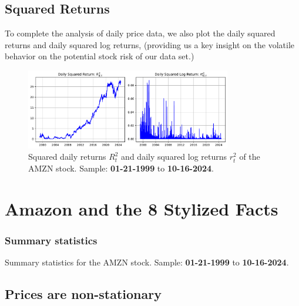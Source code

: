 \documentclass{article}
\begin{document}
\subsection{Squared Returns}

To complete the analysis of daily price data, we also plot the daily squared returns and daily squared log returns, 
(providing us a key insight on the volatile behavior on the potential stock risk of our data set.)
\begin{figure}[H]
    \centering
    \includegraphics[width=0.8\textwidth]{Img/squared_log_returns.pdf}
    \caption{Squared daily returns $R_t^2$ and daily squared log returns $r_t^2$ of the AMZN stock.
    Sample: \textbf{01-21-1999} to \textbf{10-16-2024}.}
    \label{fig:squared_logreturns}
\end{figure}

\clearpage
\setcounter{page}{1}

\section{Amazon and the 8 Stylized Facts}

\subsubsection{Summary statistics}


\begin{table}[H]
    \centering
      
    \caption{Summary statistics for the AMZN stock.
    Sample: \textbf{01-21-1999} to \textbf{10-16-2024}.}
    \label{tab:Stylized_facts_preview}
\end{table}



\subsection{Prices are non-stationary}
\end{document}
